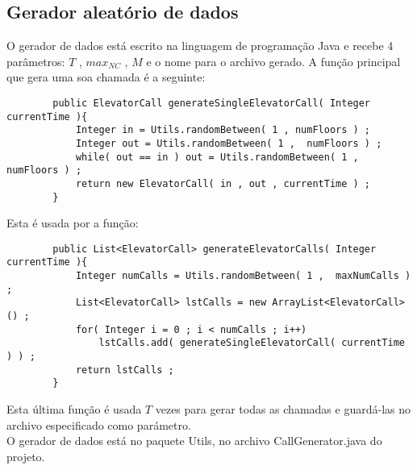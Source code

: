 \subsection{Gerador aleatório de dados}
	O gerador de dados está escrito na linguagem de programação Java e recebe 4 parâmetros: $T$ , ${max}_{NC}$ , $M$ e o nome para o archivo gerado.
	A função principal que gera uma soa chamada é a seguinte:
	\begin{lstlisting}
		public ElevatorCall generateSingleElevatorCall( Integer currentTime ){
			Integer in = Utils.randomBetween( 1 , numFloors ) ;
			Integer out = Utils.randomBetween( 1 ,  numFloors ) ;
			while( out == in ) out = Utils.randomBetween( 1 ,  numFloors ) ;
			return new ElevatorCall( in , out , currentTime ) ;
		}
	\end{lstlisting}
	Esta é usada por a função:
	\begin{lstlisting}
		public List<ElevatorCall> generateElevatorCalls( Integer currentTime ){
			Integer numCalls = Utils.randomBetween( 1 ,  maxNumCalls ) ;
			List<ElevatorCall> lstCalls = new ArrayList<ElevatorCall>() ;
			for( Integer i = 0 ; i < numCalls ; i++)
				lstCalls.add( generateSingleElevatorCall( currentTime ) ) ;
			return lstCalls ;
		}
	\end{lstlisting}
	Esta última função é usada $T$ vezes para gerar todas as chamadas e guardá-las no archivo especificado como parámetro. \\
	O gerador de dados está no paquete Utils, no archivo CallGenerator.java do projeto.